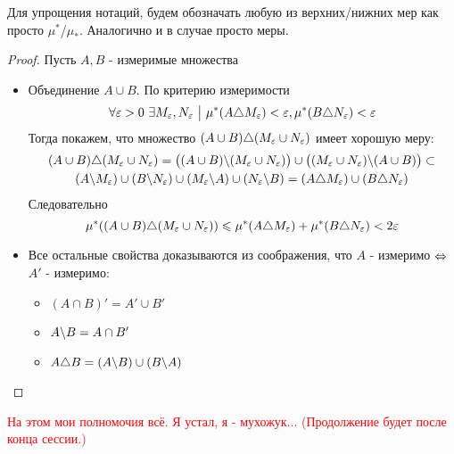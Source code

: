 \begin{note}
	Для упрощения нотаций, будем обозначать любую из верхних/нижних мер как просто $\mu^*$/$\mu_*$. Аналогично и в случае просто меры.
\end{note}

\begin{proof}
	Пусть $A, B$ - измеримые множества
	\begin{itemize}
		\item Объединение $A \cup B$. По критерию измеримости
		\[
			\forall \varepsilon > 0\ \exists M_\varepsilon, N_\varepsilon \ \big|\  \mu^*(A \triangle M_\varepsilon) < \varepsilon, \mu^*(B \triangle N_\varepsilon) < \varepsilon
		\]
		Тогда покажем, что множество $(A \cup B) \triangle (M_\varepsilon \cup N_\varepsilon)$ имеет хорошую меру:
		\begin{multline*}
			(A \cup B) \triangle (M_\varepsilon \cup N_\varepsilon) = \big((A \cup B) \backslash (M_\varepsilon \cup N_\varepsilon)\big) \cup \big((M_\varepsilon \cup N_\varepsilon) \backslash (A \cup B)\big) \subset
			\\
			(A \backslash M_\varepsilon) \cup (B \backslash N_\varepsilon) \cup (M_\varepsilon \backslash A) \cup (N_\varepsilon \backslash B) = (A \triangle M_\varepsilon) \cup (B \triangle N_\varepsilon)
		\end{multline*}
		Следовательно
		\[
			\mu^*((A \cup B) \triangle (M_\varepsilon \cup N_\varepsilon)) \leqslant \mu^*(A \triangle M_\varepsilon) + \mu^*(B \triangle N_\varepsilon) < 2\varepsilon
		\]
		
		\item Все остальные свойства доказываются из соображения, что $A$ - измеримо $\Leftrightarrow$ $A'$ - измеримо:
		\begin{itemize}
			\item \((A \cap B)' = A' \cup B'\)
			
			\item \(A \backslash B = A \cap B'\)
			
			\item \(A \triangle B = (A \backslash B) \cup (B \backslash A)\)
		\end{itemize}
	\end{itemize}
\end{proof}

\textcolor{red}{На этом мои полномочия всё. Я устал, я - мухожук... (Продолжение будет после конца сессии.)}